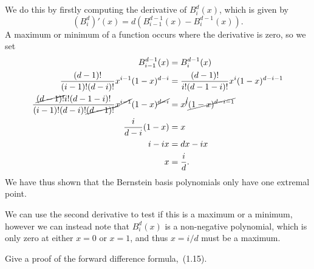 \begin{solution}
    We do this by firstly computing the derivative of $B_i^d(x)$, which is given by
    \begin{equation*}
        \left(B_i^d\right)'(x) = d \left( B_{i-1}^{d-1}(x) - B_i^{d-1}(x) \right).
    \end{equation*}
    A maximum or minimum of a function occurs where the derivative is zero, so we set
    \begin{align*}
        B_{i-1}^{d-1}(x) &= B_i^{d-1}(x) \\
        \frac{(d-1)!}{(i-1)!(d-i)!} x^{i-1} (1 - x)^{d-i} &= \frac{(d-1)!}{i!(d-1-i)!} x^i (1 - x)^{d-i-1} \\
        \frac{
            \cancel{(d-1)!} i! (d-1-i)!
        }{(i-1)! (d-i)! \cancel{(d-1)!}} \cancel{x^{i-1}} (1 - x)^{\cancel{d-i}} &= x^{\cancel{i}} \cancel{(1 - x)^{d-i-1}} \\
        \frac{i}{d-i} (1 - x) &= x \\
        i - ix &= dx - ix \\
        x &= \frac{i}{d}.
    \end{align*}
    We have thus shown that the Bernstein basis polynomials only have one extremal point.

    We can use the second derivative to test if this is a maximum or a minimum, however we can instead note that $B_i^d(x)$ is a non-negative polynomial, which is only zero at either $x = 0$ or $x = 1$, and thus $x = i / d$ must be a maximum.
\end{solution}

\begin{exercise}
    Give a proof of the forward difference formula,~(1.15).
\end{exercise}

